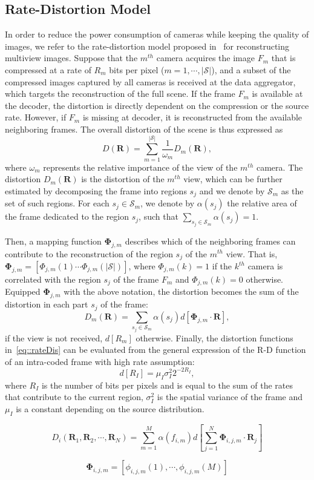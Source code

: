 \subsection{Rate-Distortion Model}
\label{sec::rateDistortion}
In order to reduce the power consumption of cameras while keeping the quality of images,
we refer to the rate-distortion model proposed in~\cite{CorrAwareScheduling} for
reconstructing multiview images.
Suppose that the $m^{th}$ camera acquires the image $F_{m}$ that is compressed at a
rate of $R_{m}$ bits per pixel ($m=1,\cdots,|\mathcal{S}|$), and a subset of the compressed images
captured by all cameras is received at the data aggregator, which targets the
reconstruction of the full scene.
If the frame $F_{m}$ is available at the decoder, the distortion is directly dependent on the compression or the source rate.
However, if $F_{m}$ is missing at decoder, it is reconstructed from the available neighboring frames.
The overall distortion of the scene is thus expressed as
\begin{equation}
D(\mathbf{R}) = \sum_{m=1}^{|\mathcal{S}|} \frac{1}{\omega_m} D_{m}(\mathbf{R}),
\end{equation}
where $\omega_m$ represents the relative importance of the view of the $m^{th}$ camera.
The distortion $D_{m}(\mathbf{R})$ is the distortion of the $m^{th}$ view, which can be
further estimated by decomposing the frame into regions $s_j$ and we denote by
$\mathcal{S}_{m}$ as the set of such regions.
For each $s_j \in \mathcal{S}_{m}$, we denote by $\alpha (s_j)$ the relative area of the
frame dedicated to the region $s_j$, such that
${\sum_{s_j \in \mathcal{S}_{m}} \alpha (s_j) = 1}$.

Then, a mapping function $\mathbf{\Phi}_{j,m}$ describes which of the neighboring frames can contribute to the reconstruction of the region $s_j$ of the $m^{th}$ view.
That is, ${\mathbf{\Phi}_{j,m} = [\Phi_{j,m}(1) \cdots \Phi_{j,m}(|\mathcal{S}|)]}$, where ${\Phi_{j,m}(k) = 1}$ if the $k^{th}$ camera is correlated with the region $s_j$ of the frame $F_{m}$ and ${\Phi_{j,m}(k) = 0}$ otherwise.
Equipped $\mathbf{\Phi}_{j,m}$ with the above notation, the distortion becomes the sum of the distortion in each part $s_j$ of the frame:
\begin{equation}
D_{m}(\mathbf{R}) = \sum_{s_j \in \mathcal{S}_{m}} \alpha (s_j) d[\mathbf{\Phi}_{j,m} \cdot \mathbf{R}],
\label{eq::rateDis}
\end{equation}
if the view is not received, $d[R_{m}]$ otherwise.
Finally, the distortion functions in~\eqref{eq::rateDis} can be evaluated from the general expression of the R-D function of an intra-coded frame with high rate assumption:
\begin{equation}
d[R_I] = \mu_I \sigma_I^2 2^{-2R_I},
\end{equation}
where $R_I$ is the number of bits per pixels and is equal to the sum of the rates that contribute to the current region, $\sigma_I^2$ is the spatial variance of the frame and $\mu_I$ is a constant depending on the source distribution.

\begin{equation}
D_i (\mathbf{R}_1,\mathbf{R}_2,\cdots,\mathbf{R}_N) = \sum_{m=1}^{M} \alpha(f_{i,m}) d[ \sum_{j=1}^N \mathbf{\Phi}_{i,j,m}\cdot \mathbf{R}_j ]
\end{equation}

\begin{equation}
\mathbf{\Phi}_{i,j,m} = [\phi_{i,j,m}(1),\cdots,\phi_{i,j,m}(M)]
\end{equation}